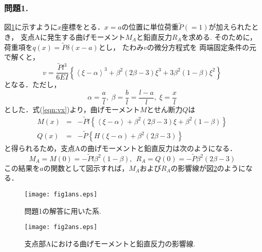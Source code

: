 ﻿\documentclass[10pt,a4j]{jarticle}
\begin{document}
\subsubsection*{問題1.}
図\ref{fig:fig1}に示すように$x$座標をとる．$x=a$の位置に単位荷重$\tilde P(=1)$が加えられたとき，
支点Aに発生する曲げモーメント$M_A$と鉛直反力$R_A$を求める.
そのために，荷重項を$q(x)=\tilde P \delta (x-a)$とし， たわみ$v$の微分方程式を
両端固定条件の元で解くと，
\begin{equation}
	v=\frac{\tilde Pl^3}{6EI}\left\{
		\left< \xi-\alpha \right>^3 +\beta^2(2\beta -3)\xi^3 +3\beta^2(1-\beta) \xi^2 
	 \right\}
	\label{eqn:vx}
\end{equation}
となる．ただし，
\begin{equation}
	\alpha=\frac{a}{l},\; \beta=\frac{b}{l}=\frac{l-a}{l}, \; \xi=\frac{x}{l}
\end{equation}
とした．式(\ref{eqn:vx})より，曲げモーメント$M$とせん断力$Q$は
\begin{eqnarray}
	M(x) &=& 
	-\tilde Pl
	\left\{
		\left< \xi-\alpha \right> +\beta^2(2\beta -3)\xi+\beta^2(1-\beta)
 	\right\}
	\\
	Q(x) &=& 
	-\tilde P
	\left\{
		H(\xi-\alpha) +\beta^2(2\beta -3)
 	\right\}
\end{eqnarray}
と得られるため，支点Aの曲げモーメントと鉛直反力は次のようになる．
\begin{equation}
	M_A=M(0)=-\tilde P l \beta^2(1-\beta), \ \ 
	R_A=Q(0)=-\tilde P \beta^2 ( 2\beta-3)
\end{equation}
この結果を$a$の関数として図示すれば，$M_A$および$R_A$の影響線が図\ref{fig:fig2}のようになる．
\begin{figure}[h]
	\begin{center}
	\texttt{[image: fig1ans.eps]}
	\end{center}
	\caption{問題1の解答に用いた系.}
	\label{fig:fig1}
\end{figure}
\begin{figure}[h]
	\begin{center}
	\texttt{[image: fig2ans.eps]} 
	\end{center}
	\caption{支点部Aにおける曲げモーメントと鉛直反力の影響線.}
	\label{fig:fig2}
\end{figure}
%
%
\end{document}

